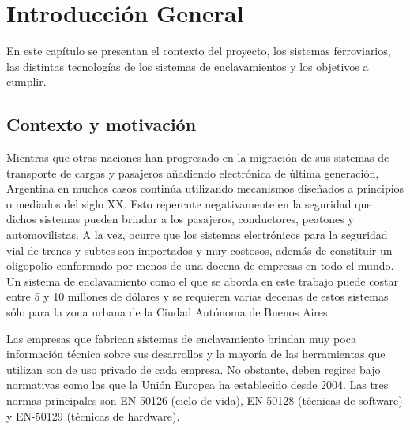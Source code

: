
\chapter{Introducción General} %

\label{Chapter1} %
\label{IntroGeneral}


\newcommand{\keyword}[1]{\textbf{#1}}
\newcommand{\tabhead}[1]{\textbf{#1}}
\newcommand{\code}[1]{\texttt{#1}}
\newcommand{\file}[1]{\texttt{\bfseries#1}}
\newcommand{\option}[1]{\texttt{\itshape#1}}
\newcommand{\grados}{$^{\circ}$}


En este capítulo se presentan el contexto del proyecto, los sistemas ferroviarios, las distintas tecnologías de los sistemas de enclavamientos y los objetivos a cumplir.

		
	\section{Contexto y motivación}
	
		Mientras que otras naciones han progresado en la migración de sus sistemas de transporte de cargas y pasajeros añadiendo electrónica de última generación, Argentina en muchos casos continúa utilizando mecanismos diseñados a principios o mediados del siglo XX. Esto repercute negativamente en la seguridad que dichos sistemas pueden brindar a los pasajeros, conductores, peatones y automovilistas. A la vez, ocurre que los sistemas electrónicos para la seguridad vial de trenes y subtes son importados y muy costosos, además de constituir un oligopolio conformado por menos de una docena de empresas en todo el mundo. Un sistema de enclavamiento como el que se aborda en este trabajo puede costar entre 5 y 10 millones de dólares\citep{SIEMENS} y se requieren varias decenas de estos sistemas sólo para la zona urbana de la Ciudad Autónoma de Buenos Aires.
		
		Las empresas que fabrican sistemas de enclavamiento brindan muy poca información técnica sobre sus desarrollos y la mayoría de las herramientas que utilizan son de uso privado de cada empresa. No obstante, deben regirse bajo normativas como las que la Unión Europea ha establecido desde 2004. Las tres normas principales son EN-50126\citep{EN50126} (ciclo de vida), EN-50128\citep{EN50128} (técnicas de software) y EN-50129\citep{EN50129} (técnicas de hardware). %
		
